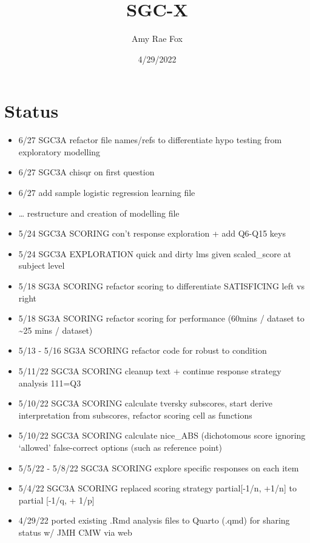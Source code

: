 \documentclass[
  letterpaper,
  DIV=11,
  numbers=noendperiod]{scrreprt}
\title{SGC-X}
\author{Amy Rae Fox}
\date{4/29/2022}
\providecommand{\tightlist}{%
  \setlength{\itemsep}{0pt}\setlength{\parskip}{0pt}}\usepackage{longtable,booktabs,array}
\renewcommand*\contentsname{Table of contents}
\newcommand\contentsname{Table of contents}
\begin{document}
\maketitle
\ifdefined\Shaded\renewenvironment{Shaded}{\begin{tcolorbox}[borderline west={3pt}{0pt}{shadecolor}, boxrule=0pt, enhanced, interior hidden, breakable, sharp corners, frame hidden]}{\end{tcolorbox}}\fi

\renewcommand*\contentsname{Table of contents}
{
\hypersetup{linkcolor=}
\setcounter{tocdepth}{2}
\tableofcontents
}

\hypertarget{status}{%
\chapter*{Status}\label{status}}

\begin{itemize}
\tightlist
\item
  6/27 \textbar{} SGC3A refactor file names/refs to differentiate hypo
  testing from exploratory modelling
\item
  6/27 \textbar{} SGC3A chisqr on first question
\item
  6/27 \textbar{} add sample logistic regression learning file
\item
  \ldots{} restructure and creation of modelling file
\item
  5/24 \textbar{} SGC3A SCORING\textbar{} con't response exploration +
  add Q6-Q15 keys
\item
  5/24 \textbar{} SGC3A EXPLORATION\textbar{} quick and dirty lms given
  scaled\_score at subject level
\item
  5/18 \textbar{} SG3A SCORING \textbar{} refactor scoring to
  differentiate SATISFICING left vs right
\item
  5/18 \textbar{} SG3A SCORING \textbar{} refactor scoring for
  performance (60mins / dataset to \textasciitilde25 mins / dataset)
\item
  5/13 - 5/16 \textbar{} SG3A SCORING \textbar{} refactor code for
  robust to condition
\item
  5/11/22 \textbar{} SGC3A SCORING \textbar{} cleanup text + continue
  response strategy analysis 111=Q3
\item
  5/10/22 \textbar{} SGC3A SCORING \textbar{} calculate tversky
  subscores, start derive interpretation from subscores, refactor
  scoring cell as functions
\item
  5/10/22 \textbar{} SGC3A SCORING \textbar{} calculate nice\_ABS
  (dichotomous score ignoring `allowed' false-correct options (such as
  reference point)
\item
  5/5/22 - 5/8/22 \textbar{} SGC3A SCORING \textbar{} explore specific
  responses on each item
\item
  5/4/22 \textbar{} SGC3A SCORING \textbar{} replaced scoring strategy
  partial{[}-1/n, +1/n{]} to partial {[}-1/q, + 1/p{]}
\item
  4/29/22 \textbar{} ported existing .Rmd analysis files to Quarto
  (.qmd) for sharing status w/ JMH CMW via web
\end{itemize}
\end{document}

